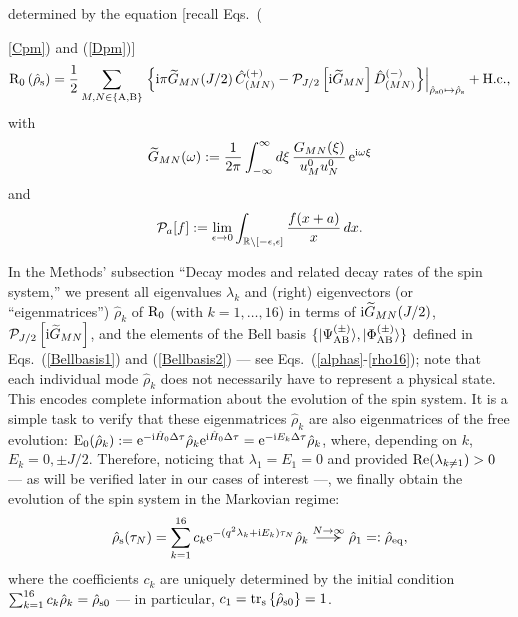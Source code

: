 \documentclass[]{nature}
\newcommand{\toover}[2][1.5]{
  \mathrel{\overset{#2}{\scalebox{#1}[1]{$\to$}}}
}
\begin{document}
determined by the equation [recall Eqs.~({\ref{Cpm}) and (\ref{Dpm})]
\begin{eqnarray}
{\rm R}_0 \left(\hat\rho_{{\rm s}}\right)= \frac{1}{2}
\sum_{
{M,N\in\{{\rm A},{\rm B}\}}}
 \left.\left\{ {\rm i} \pi\widetilde{G}_{MN}(J/2)\, \hat C^{(+)}_{(MN)} -{\cal P}_{J/2}\left[{\rm i}\widetilde{G}_{MN}\right]\hat D^{(-)}_{(MN)} 
\right\}\right|_{\hat\rho_{{\rm s}0}\mapsto \hat\rho_{{\rm s}}}
+{\rm H.c.},
 \label{R0}
\end{eqnarray}
with
\begin{eqnarray}
\widetilde{G}_{MN}(\omega) := \frac{1}{2\pi}\int_{-\infty}^\infty d\xi \,\frac{{G}_{MN}(\xi)}{u_M^0 u_N^0} \,{\rm e}^{{\rm i}\omega \xi}
\label{Gftilde}
\end{eqnarray}
and
\begin{eqnarray}
{\cal P}_a[f] := \lim_{\epsilon \to 0}\int_{{\mathbb R} \backslash [-\epsilon,\epsilon]}\frac{f(x+a)}{x}\,dx.
\label{PV}
\end{eqnarray}

In the Methods' subsection ``Decay modes and related decay rates of the spin system,'' we present  all
eigenvalues $\lambda_k$ and (right) eigenvectors (or ``eigenmatrices'') $\hat \rho_k$ of ${\rm R}_0$ (with $k=1,\dots,16$) in terms of ${\rm i}\widetilde{G}_{MN}(J/2)$, 
${\cal P}_{J/2}\left[{\rm i}\widetilde{G}_{MN}\right]$, and the elements of the Bell basis $\{|\Psi_{\rm AB}^{(\pm)}\rangle,|\Phi_{\rm AB}^{(\pm)}\rangle\}$ defined in Eqs.~(\ref{Bellbasis1})
and (\ref{Bellbasis2})  --- see Eqs.~(\ref{alphas}-\ref{rho16}); note that each individual mode $\hat{\rho}_k$ does not necessarily have to represent a physical state.
This encodes complete information about the evolution of the 
spin system.
It is a simple task to verify
that these eigenmatrices $\hat\rho_k$ are also eigenmatrices of the free
evolution: ${\rm E}_0(\hat\rho_k) := {\rm e}^{-{\rm i}\hat H_0 \Delta \tau}\hat \rho_k {\rm e}^{{\rm i} \hat H_0 \Delta \tau} = {\rm e}^{-{\rm i} E_k \Delta\tau} \hat \rho_k$, where,
depending on $k$,
$E_k = 0,\pm J/2$. Therefore, noticing that $\lambda_1=E_1 = 0$ and provided 
${\rm Re}(\lambda_{k\neq 1}) > 0$ --- as will be verified later in our cases of interest ---, we finally obtain the evolution of the spin system in the Markovian regime:
\begin{eqnarray}
\hat\rho_{\rm s}(\tau_N) =\sum_{k=1}^{16} c_k {\rm e}^{-(q^2\lambda_k+{\rm i}E_k) \tau_N}\hat\rho_{k} 
\toover[2]{N\to\infty}
\hat\rho_1 =: \hat \rho_{\rm eq},
\label{evolfinalasymp}
\end{eqnarray}
where the coefficients $c_k$ are uniquely determined by the initial condition $\sum_{k=1}^{16} c_k\hat\rho_k = \hat\rho_{\rm s0}$ --- in particular, $c_1 = {\rm tr}_{\rm s}\left\{\hat\rho_{\rm s0}\right\} = 1$.




}
\end{document}
